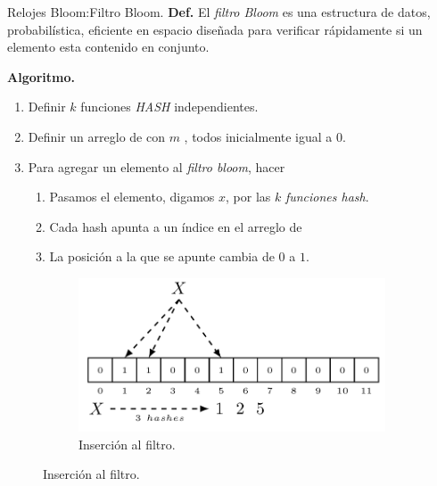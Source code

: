 \begin{frame}[fragile]{Relojes Bloom:}{Filtro Bloom.}
  \justifying
  \textbf{Def.} El \textit{filtro Bloom} es una estructura de datos,
  probabilística, eficiente en espacio diseñada para verificar rápidamente
  si un elemento esta contenido en conjunto.\newline

  \textbf{Algoritmo.}
  \begin{enumerate}
  \item Definir $k$ funciones \textit{HASH} independientes.
  \item Definir un arreglo de  con $m$ ,
    todos inicialmente igual a $0$.
  \item Para agregar un elemento al \textit{filtro bloom}, hacer
    \begin{enumerate}
    \item Pasamos el elemento, digamos $x$, por las $k$ \textit{funciones
      hash}.
    \item Cada hash apunta a un índice en el arreglo de 
    \item La posición a la que se apunte cambia de $0$ a $1$.
    \end{enumerate}
  \end{enumerate}

  \begin{figure}
    \centering
    \begin{subfigure}[b]{0.5\textwidth}
      \includegraphics[width=\textwidth]{./Imagenes/Hash01}
      \caption{Inserción al filtro.}
      \label{fig:Ejemplo de Hash(X).}
    \end{subfigure}
  \end{figure}
\end{frame}
